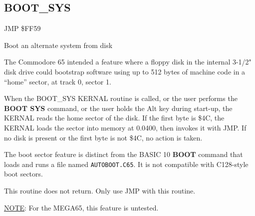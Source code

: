 
\newpage
\subsection{BOOT{\_}SYS}
\label{KERNAL Jump Table!BOOT_SYS}
\begin{description}[leftmargin=2cm,style=nextline]
    \item [Address:] JMP \$FF59
    \item [Description:] Boot an alternate system from disk
    \item [Remarks:]
        The Commodore 65 intended a feature where a floppy disk in the internal 3-1/2" disk drive could bootstrap software using up to 512 bytes of machine code in a ``home'' sector, at track 0, sector 1.

        When the BOOT\_SYS KERNAL routine is called, or the user performs the \textbf{BOOT SYS} command, or the user holds the Alt key during start-up, the KERNAL reads the home sector of the disk. If the first byte is \$4C, the KERNAL loads the sector into memory at 0.0400, then invokes it with JMP. If no disk is present or the first byte is not \$4C, no action is taken.

        The boot sector feature is distinct from the BASIC 10 \textbf{BOOT} command that loads and runs a file named \texttt{AUTOBOOT.C65}. It is not compatible with C128-style boot sectors.

        This routine does not return. Only use JMP with this routine.

        \underline{NOTE}: For the MEGA65, this feature is untested.
    \item [Example:]

\end{description}



\newpage
